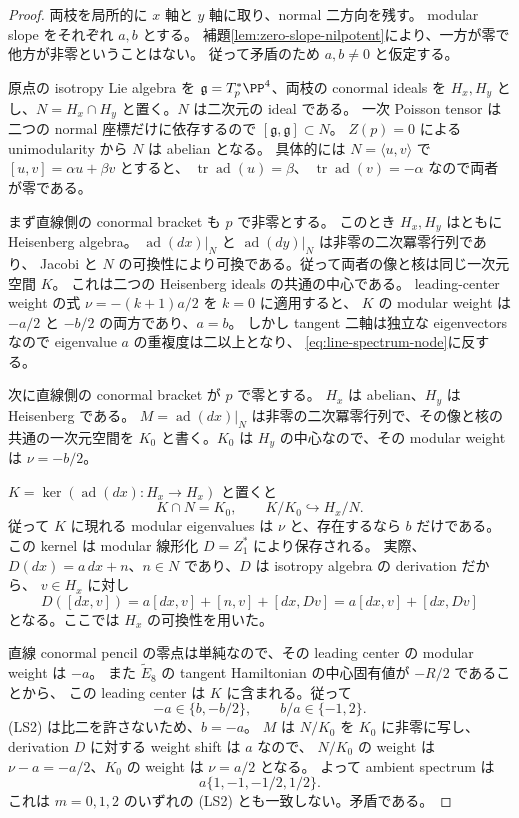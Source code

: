 \begin{proof}
両枝を局所的に $x$ 軸と $y$ 軸に取り、normal 二方向を残す。
modular slope をそれぞれ $a,b$ とする。
補題\ref{lem:zero-slope-nilpotent}により、一方が零で他方が非零ということはない。
従って矛盾のため $a,b\ne0$ と仮定する。

原点の isotropy Lie algebra を $\mathfrak g=T_p^*\PP^4$、両枝の conormal ideals を
$H_x,H_y$ とし、$N=H_x\cap H_y$ と置く。$N$ は二次元の ideal である。
一次 Poisson tensor は二つの normal 座標だけに依存するので
$[\mathfrak g,\mathfrak g]\subset N$。
$Z(p)=0$ による unimodularity から $N$ は abelian となる。
具体的には $N=\langle u,v\rangle$ で $[u,v]=\alpha u+\beta v$ とすると、
$\operatorname{tr}\operatorname{ad}(u)=\beta$、
$\operatorname{tr}\operatorname{ad}(v)=-\alpha$ なので両者が零である。

まず直線側の conormal bracket も $p$ で非零とする。
このとき $H_x,H_y$ はともに Heisenberg algebra。
$\operatorname{ad}(dx)|_N$ と $\operatorname{ad}(dy)|_N$ は非零の二次冪零行列であり、
Jacobi と $N$ の可換性により可換である。従って両者の像と核は同じ一次元空間 $K$。
これは二つの Heisenberg ideals の共通の中心である。
leading-center weight の式 $\nu=-(k+1)a/2$ を $k=0$ に適用すると、
$K$ の modular weight は $-a/2$ と $-b/2$ の両方であり、$a=b$。
しかし tangent 二軸は独立な eigenvectors なので eigenvalue $a$ の重複度は二以上となり、
\eqref{eq:line-spectrum-node}に反する。

次に直線側の conormal bracket が $p$ で零とする。
$H_x$ は abelian、$H_y$ は Heisenberg である。
$M=\operatorname{ad}(dx)|_N$ は非零の二次冪零行列で、その像と核の共通の一次元空間を
$K_0$ と書く。$K_0$ は $H_y$ の中心なので、その modular weight は $\nu=-b/2$。

$K=\ker(\operatorname{ad}(dx):H_x\to H_x)$ と置くと
\[
 K\cap N=K_0,\qquad K/K_0\hookrightarrow H_x/N.
\]
従って $K$ に現れる modular eigenvalues は $\nu$ と、存在するなら $b$ だけである。
この kernel は modular 線形化 $D=Z_1^*$ により保存される。
実際、$D(dx)=a\,dx+n$、$n\in N$ であり、$D$ は isotropy algebra の derivation だから、
$v\in H_x$ に対し
\[
 D([dx,v])=a[dx,v]+[n,v]+[dx,Dv]
 =a[dx,v]+[dx,Dv]
\]
となる。ここでは $H_x$ の可換性を用いた。

直線 conormal pencil の零点は単純なので、その leading center の modular weight は $-a$。
また $\widetilde E_8$ の tangent Hamiltonian の中心固有値が $-R/2$ であることから、
この leading center は $K$ に含まれる。従って
\[
 -a\in\{b,-b/2\},\qquad b/a\in\{-1,2\}.
\]
(LS2) は比二を許さないため、$b=-a$。
$M$ は $N/K_0$ を $K_0$ に非零に写し、derivation $D$ に対する weight shift は $a$ なので、
$N/K_0$ の weight は $\nu-a=-a/2$、$K_0$ の weight は $\nu=a/2$ となる。
よって ambient spectrum は
\[
 a\{1,-1,-1/2,1/2\}.
\]
これは $m=0,1,2$ のいずれの (LS2) とも一致しない。矛盾である。
\end{proof}

